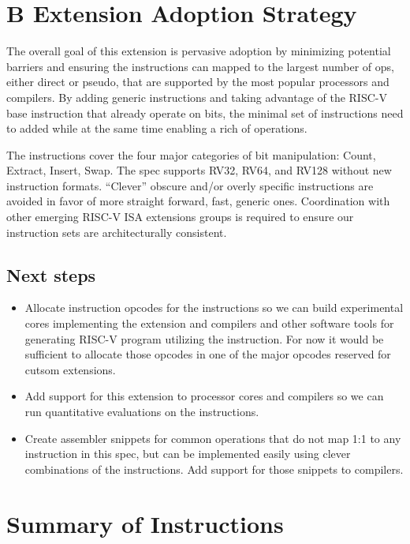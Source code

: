 \section{B Extension Adoption Strategy}

The overall goal of this extension is pervasive adoption by minimizing
potential barriers and ensuring the instructions can mapped to the
largest number of ops, either direct or pseudo, that are supported by
the most popular processors and compilers. By adding generic
instructions and taking advantage of the RISC-V base instruction that
already operate on bits, the minimal set of instructions need to added
while at the same time enabling a rich of operations.

The instructions cover the four major categories of bit manipulation: Count,
Extract, Insert, Swap. The spec supports RV32, RV64, and RV128 without new
instruction formats. ``Clever'' obscure and/or overly specific instructions are
avoided in favor of more straight forward, fast, generic ones.  Coordination
with other emerging RISC-V ISA extensions groups is required to ensure our
instruction sets are architecturally consistent.

\subsection{Next steps}

\begin{itemize}
\item
  Allocate instruction opcodes for the instructions so we can build
  experimental cores implementing the extension and compilers and other
  software tools for generating RISC-V program utilizing the instruction.
  For now it would be sufficient to allocate those opcodes in one of the
  major opcodes reserved for cutsom extensions.
\item
  Add support for this extension to processor cores and compilers
  so we can run quantitative evaluations on the instructions.
\item
  Create assembler snippets for common operations that do not map 1:1
  to any instruction in this spec, but can be implemented easily using
  clever combinations of the instructions. Add support for those snippets
  to compilers.
\end{itemize}

\section{Summary of Instructions}

